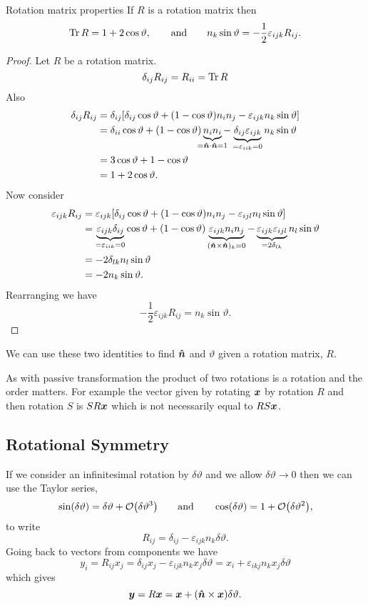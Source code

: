 \begin{lemma}{Rotation matrix properties}{}
    If \(R\) is a rotation matrix then
    \[\Tr R = 1 + 2\cos\vartheta, \qquad\text{and}\qquad n_k\sin\vartheta = -\frac{1}{2}\varepsilon_{ijk}R_{ij}.\]
\end{lemma}
\begin{proof}
    Let \(R\) be a rotation matrix.
    \[\delta_{ij}R_{ij} = R_{ii} = \Tr R\]
    Also
    \begin{align*}
        \delta_{ij}R_{ij} &= \delta_{ij}[\delta_{ij} \cos\vartheta + (1 - \cos\vartheta)n_in_j - \varepsilon_{ijk}n_k\sin\vartheta]\\
        &= \delta_{ii}\cos\vartheta + (1 - \cos\vartheta)\underbrace{n_in_i}_{\mathclap{=\vh{n}\cdot\vh{n} = 1}} - \underbrace{\delta_{ij}\varepsilon_{ijk}}_{=\varepsilon_{iik} = 0}n_k\sin\vartheta\\
        &= 3\cos\vartheta + 1 - \cos\vartheta\\
        &= 1 + 2\cos\vartheta.
    \end{align*}
    Now consider
    \begin{align*}
        \varepsilon_{ijk}R_{ij} &= \varepsilon_{ijk}[\delta_{ij} \cos\vartheta + (1 - \cos\vartheta)n_in_j - \varepsilon_{ijl}n_l\sin\vartheta]\\
        &= \underbrace{\varepsilon_{ijk}\delta_{ij}}_{=\varepsilon_{iik} = 0}\cos\vartheta + (1 - \cos\vartheta)\underbrace{\varepsilon_{ijk}n_in_j}_{(\bm{\hat{n}}\times\bm{\hat{n}})_k = 0} - \underbrace{\varepsilon_{ijk}\varepsilon_{ijl}}_{=2\delta_{lk}} n_l\sin\vartheta\\
        &= -2\delta_{lk}n_l\sin\vartheta\\
        &= -2n_k\sin\vartheta.
    \end{align*}
    Rearranging we have
    \[-\frac{1}{2}\varepsilon_{ijk}R_{ij} = n_k\sin\vartheta.\]
\end{proof}
We can use these two identities to find \(\bm{\hat{n}}\) and \(\vartheta\) given a rotation matrix, \(R\).

As with passive transformation the product of two rotations is a rotation and the order matters.
For example the vector given by rotating \(\bm{x}\) by rotation \(R\) and then rotation \(S\) is \(SR\bm{x}\) which is not necessarily equal to \(RS\bm{x}\).

\subsection{Rotational Symmetry}
If we consider an infinitesimal rotation by \(\delta\vartheta\) and we allow \(\delta\vartheta \to 0\) then we can use the Taylor series,
\[\sin(\delta\vartheta) = \delta\vartheta + \order{\delta\vartheta^3} \qquad\text{and}\qquad \cos(\delta\vartheta) = 1 + \order{\delta\vartheta^2},\]
to write
\[R_{ij} = \delta_{ij} - \varepsilon_{ijk}n_k\delta\vartheta.\]
Going back to vectors from components we have
\[y_i = R_{ij}x_j = \delta_{ij}x_j - \varepsilon_{ijk}n_kx_j\delta\vartheta = x_i + \varepsilon_{ikj}n_kx_j\delta\vartheta\]
which gives
\[\bm{y} = R\bm{x} = \bm{x} + (\bm{\hat{n}}\times\bm{x})\delta\vartheta.\]

